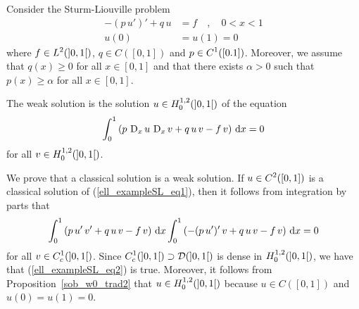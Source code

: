 \begin{egg}
Consider the Sturm-Liouville problem
\begin{equation} \label{ell_exampleSL_eq1}
\begin{split}
-(p\, u')' + q\,u &= f \quad , \quad 0<x < 1 \\
u(0)&= u(1)=0
\end{split}
\end{equation}
where $\displaystyle f\in L^2(]0,1[)$, $q\in C([0,1])$ and
$\displaystyle p\in C^1([0.1])$.
Moreover, we assume that $q(x)\geq 0$ for all $x\in [0,1]$ and that
there exists $\alpha>0$ such that $p(x) \geq \alpha$ for all
$x\in[0,1]$.   \label{ell_exampleSL}

The weak solution is the solution $\displaystyle u\in H^{1,2}_0(]0,1[)$ of the
equation
\begin{equation} \label{ell_exampleSL_eq2}
\int_0^1 \left( p\, \operatorname{D}_x u \, \operatorname{D}_x v + q\, u\, v
- f\, v \right) \,\mathrm{d}{x} = 0
\end{equation}
for all $\displaystyle v \in H^{1,2}_0(]0,1[)$.

We prove that a classical solution is a weak solution.  
If $\displaystyle u\in C^2([0,1])$ is a classical solution of
(\ref{ell_exampleSL_eq1}), then it follows from integration by parts that
\[
\int_0^1 \left( p\,u'\, v' + q\, u\, v - f\, v \right) \,\mathrm{d}{x}
\int_0^1 \left( -(p\,u')'\, v + q\, u\, v - f\, v \right) \,\mathrm{d}{x} = 0
\]
for all $\displaystyle v \in C^1_c(]0,1[)$.   Since
$\displaystyle C^1_c(]0,1[) \supset \mathcal{D}(]0,1[)$ is dense in
$\displaystyle H^{1,2}_0(]0,1[)$, we have that
(\ref{ell_exampleSL_eq2}) is true.  Moreover, it follows from 
Proposition~\ref{sob_w0_trad2} that
$\displaystyle u\in H^{1,2}_0(]0,1[)$ because
$u\in C([0,1])$ and $u(0)=u(1)=0$.


\end{egg}

